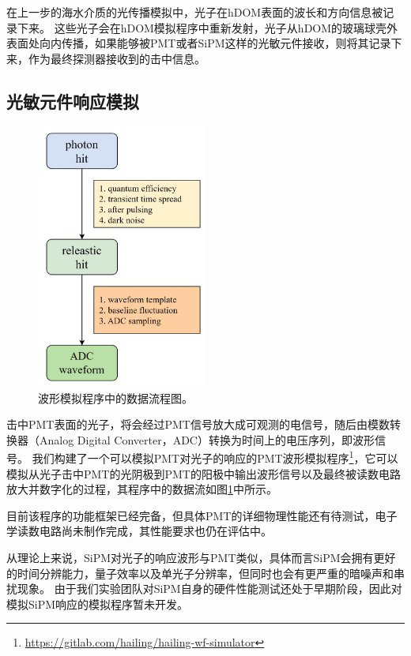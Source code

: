 在上一步的海水介质的光传播模拟中，光子在hDOM表面的波长和方向信息被记录下来。
这些光子会在hDOM模拟程序中重新发射，光子从hDOM的玻璃球壳外表面处向内传播，如果能够被PMT或者SiPM这样的光敏元件接收，则将其记录下来，作为最终探测器接收到的击中信息。

\subsection{光敏元件响应模拟}

\begin{figure}[htb]
\centering
    \includegraphics[width=0.5\textwidth]{img/waveform_simulation.jpg}
    \caption{波形模拟程序中的数据流程图。}
    \label{fig:waveform_simulation}
\end{figure}

击中PMT表面的光子，将会经过PMT信号放大成可观测的电信号，随后由模数转换器（Analog Digital Converter，ADC）转换为时间上的电压序列，即波形信号。
我们构建了一个可以模拟PMT对光子的响应的PMT波形模拟程序\footnote{\url{https://gitlab.com/hailing/hailing-wf-simulator}}，它可以模拟从光子击中PMT的光阴极到PMT的阳极中输出波形信号以及最终被读数电路放大并数字化的过程，其程序中的数据流如图\ref{fig:waveform_simulation}中所示。

目前该程序的功能框架已经完备，但具体PMT的详细物理性能还有待测试，电子学读数电路尚未制作完成，其性能要求也仍在评估中。

从理论上来说，SiPM对光子的响应波形与PMT类似，具体而言SiPM会拥有更好的时间分辨能力，量子效率以及单光子分辨率，但同时也会有更严重的暗噪声和串扰现象。
由于我们实验团队对SiPM自身的硬件性能测试还处于早期阶段，因此对模拟SiPM响应的模拟程序暂未开发。
